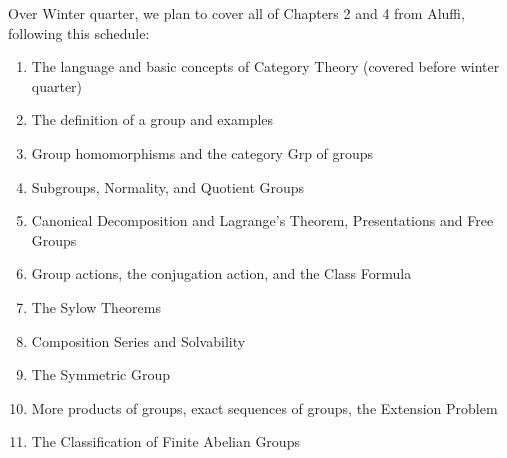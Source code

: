 \documentclass[11pt]{article}
\begin{document}
Over Winter quarter, we plan to cover all of Chapters 2 and 4 from Aluffi, following this schedule:
\begin{enumerate}[start = 0, label = Week \arabic*:]
\item The language and basic concepts of Category Theory (covered before winter quarter)
\item The definition of a group and examples
\item Group homomorphisms and the category \textsf{Grp} of groups
\item Subgroups, Normality, and Quotient Groups
\item Canonical Decomposition and Lagrange's Theorem, Presentations and Free Groups
\item Group actions, the conjugation action, and the Class Formula
\item The Sylow Theorems
\item Composition Series and Solvability
\item The Symmetric Group
\item More products of groups, exact sequences of groups, the Extension Problem
\item The Classification of Finite Abelian Groups
\end{enumerate}

\end{document}

